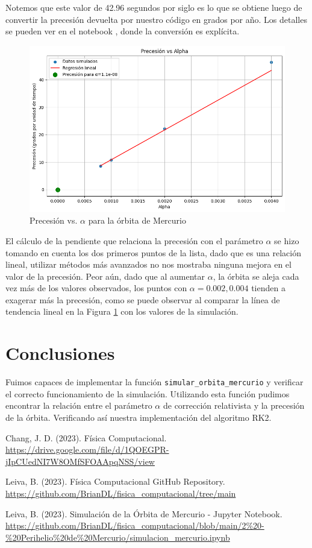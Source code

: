 \documentclass[twocolumn]{article}
\begin{document}
Notemos que este valor de 42.96 segundos por siglo es lo que se obtiene luego de convertir la precesión devuelta por nuestro código en grados por año. Los detalles se pueden ver en el notebook \cite{mercurio_notebook}, donde la conversión es explícita.

\begin{figure}[H]
\centering
\includegraphics[width=0.9\columnwidth]{./figures/precesion_vs_alpha_mercurio.png}
\caption{Precesión vs. $\alpha$ para la órbita de Mercurio}
\label{fig:precesion_vs_alpha}
\end{figure}

El cálculo de la pendiente que relaciona la precesión con el parámetro $\alpha$ se hizo tomando en cuenta los dos primeros puntos de la lista, dado que es una relación lineal, utilizar métodos más avanzados no nos mostraba ninguna mejora en el valor de la precesión. Peor aún, dado que al aumentar $\alpha$, la órbita se aleja cada vez más de los valores observados, los puntos con $\alpha = 0.002, 0.004$ tienden a exagerar más la precesión, como se puede observar al comparar la línea de tendencia lineal en la Figura \ref{fig:precesion_vs_alpha} con los valores de la simulación.

\section{Conclusiones}

Fuimos capaces de implementar la función \texttt{simular\_orbita\_mercurio} y verificar el correcto funcionamiento de la simulación. Utilizando esta función pudimos encontrar la relación entre el parámetro $\alpha$ de corrección relativista y la precesión de la órbita. Verificando así nuestra implementación del algoritmo RK2.

\begin{thebibliography}{3}

Chang, J. D. (2023). Física Computacional. 
\url{https://drive.google.com/file/d/1QOEGPR-jIpCUedNI7W8OMfSFOAApqNSS/view}

Leiva, B. (2023). Física Computacional GitHub Repository. 
\url{https://github.com/BrianDL/fisica_computacional/tree/main}

Leiva, B. (2023). Simulación de la Órbita de Mercurio - Jupyter Notebook. 
\url{https://github.com/BrianDL/fisica_computacional/blob/main/2%20-%20Perihelio%20de%20Mercurio/simulacion_mercurio.ipynb}

\end{thebibliography}
\end{document}
